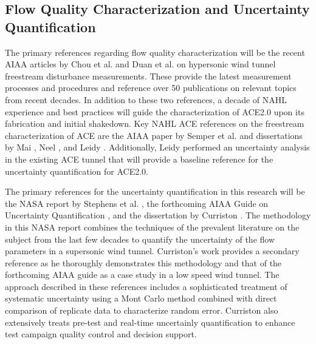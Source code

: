 \subsection{Flow Quality Characterization and Uncertainty Quantification}
The primary references regarding flow quality characterization will be the recent AIAA articles by Chou et al. \cite{chou} and Duan et al. \cite{duan} on hypersonic wind tunnel freestream disturbance measurements. These provide the latest measurement processes and procedures and reference over 50 publications on relevant topics from recent decades. In addition to these two references, a decade of NAHL experience and best practices will guide the characterization of ACE2.0 upon its fabrication and initial shakedown. Key NAHL ACE references on the freestream characterization of ACE are the AIAA paper by Semper et al. \cite{aceturb} and dissertations by Mai \cite{mai-dis}, Neel \cite{neel-dis}, and Leidy \cite{leidy-dis}. Additionally, Leidy performed an uncertainty analysis in the existing ACE tunnel that will provide a baseline reference for the uncertainty quantification for ACE2.0.

The primary references for the uncertainty quantification in this research will be the NASA report by Stephens et al. \cite{stephens-hubbard}, the forthcoming AIAA Guide on Uncertainty Quantification \cite{aiaa-uncertainty-guide}, and the dissertation by Curriston \cite{curriston-dis}. The methodology in this NASA report combines the techniques of the prevalent literature on the subject from the last few decades to quantify the uncertainty of the flow parameters in a supersonic wind tunnel. Curriston's work provides a secondary reference as he thoroughly demonstrates this methodology and that of the forthcoming AIAA guide as a case study in a low speed wind tunnel. The approach described in these references includes a sophisticated treatment of systematic uncertainty using a Mont Carlo method combined with direct comparison of replicate data to characterize random error. Curriston \cite{curriston-dis} also extensively treats pre-test and real-time uncertainly quantification to enhance test campaign quality control and decision support.

